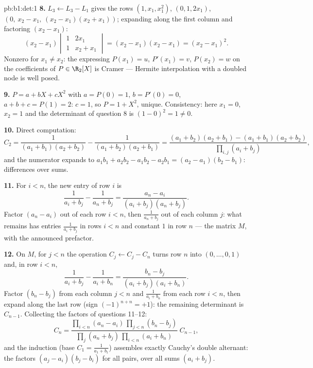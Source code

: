 \begin{solution}{pb:b1:det:1}
\textbf{8.} $L_3 \leftarrow L_3 - L_1$ gives the rows $(1, x_1,
x_1^2)$, $(0, 1, 2x_1)$, $(0,\ x_2 - x_1,\ (x_2-x_1)(x_2+x_1))$;
expanding along the first column and factoring $(x_2 - x_1)$:
\[
(x_2 - x_1)\begin{vmatrix} 1 & 2x_1\\ 1 & x_2 + x_1
\end{vmatrix} = (x_2 - x_1)(x_2 - x_1) = (x_2 - x_1)^2 .
\]
Nonzero for $x_1 \neq x_2$: the  expressing
$P(x_1) = u$, $P'(x_1) = v$, $P(x_2) = w$ on the coefficients of
$P \in \R_2[X]$ is Cramer --- Hermite interpolation with a
doubled node is well posed.

\textbf{9.} $P = a + bX + cX^2$ with $a = P(0) = 1$, $b = P'(0)
= 0$, $a + b + c = P(1) = 2$: $c = 1$, so $P = 1 + X^2$, unique.
Consistency: here $x_1 = 0$, $x_2 = 1$ and the determinant of
question 8 is $(1 - 0)^2 = 1 \neq 0$.

\textbf{10.} Direct computation:
\[
C_2 = \frac{1}{(a_1+b_1)(a_2+b_2)} - \frac{1}{(a_1+b_2)(a_2+b_1)}
= \frac{(a_1+b_2)(a_2+b_1) - (a_1+b_1)(a_2+b_2)}
{\prod_{i,j}(a_i+b_j)} ,
\]
and the numerator expands to $a_1b_1 + a_2b_2 - a_1b_2 - a_2b_1
= (a_2 - a_1)(b_2 - b_1)$: differences over sums.

\textbf{11.} For $i < n$, the new entry of row $i$ is
\[
\frac{1}{a_i + b_j} - \frac{1}{a_n + b_j}
= \frac{a_n - a_i}{(a_i + b_j)(a_n + b_j)} .
\]
Factor $(a_n - a_i)$ out of each row $i < n$, then
$\frac1{a_n + b_j}$ out of each column $j$: what remains has
entries $\frac1{a_i + b_j}$ in rows $i < n$ and constant $1$ in
row $n$ --- the matrix $M$, with the announced prefactor.

\textbf{12.} On $M$, for $j < n$ the operation $C_j \leftarrow
C_j - C_n$ turns row $n$ into $(0, \dots, 0, 1)$ and, in row $i
< n$,
\[
\frac{1}{a_i + b_j} - \frac{1}{a_i + b_n}
= \frac{b_n - b_j}{(a_i + b_j)(a_i + b_n)} .
\]
Factor $(b_n - b_j)$ from each column $j < n$ and $\frac1{a_i +
b_n}$ from each row $i < n$, then expand along the last row
(sign $(-1)^{n+n} = +1$): the remaining determinant is
$C_{n-1}$. Collecting the factors of questions 11--12:
\[
C_n = \frac{\prod_{i<n}(a_n - a_i)\,\prod_{j<n}(b_n - b_j)}
{\prod_{j}(a_n + b_j)\,\prod_{i<n}(a_i + b_n)}\;C_{n-1},
\]
and the induction (base $C_1 = \frac1{a_1+b_1}$) assembles
exactly Cauchy's double alternant: the factors $(a_j - a_i)(b_j
- b_i)$ for all pairs, over all sums $(a_i + b_j)$.


\end{solution}
